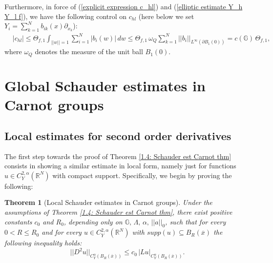 \documentclass{article}
\newtheorem{theorem}{Theorem}[section]
\numberwithin{equation}{section}
\begin{document}
\vspace{2mm}

Furthermore, in force of (\ref{explicit expression c_hl}) and (\ref{elliptic estimate Y_h Y_l f}), we have the following control on $c_{hl}$ (here below we set $Y_i=\sum_{k=1}^N b_{ik}(x) \partial_{x_k}$):
    \begin{align*}
        & |c_{hl}| \leq \Theta_{f,1} \int_{||w||=1}\sum_{i=1}^N |b_i(w)| \, dw \leq \Theta_{f,1} \, \omega_Q \sum_{k=1}^N ||b_i||_{L^{\infty}(\partial B_1(0))} = c(\mathbb{G}) \, \Theta_{f,1},
    \end{align*}
    where $\omega_Q$ denotes the measure of the unit ball $B_1(0)$.

\vspace{5mm}

\section{Global Schauder estimates in Carnot groups} \label{sec 3}
\subsection{Local estimates for second order derivatives}

The first step towards the proof of Theorem \ref{1.4: Schauder est Carnot thm} consists in showing a similar estimate in local form, namely just for functions $u \in C^{2,\alpha}_Y(\mathbb{R}^N)$ with  compact support. Specifically, we begin by proving the following:

\vspace{2mm}

\begin{theorem}[Local Schauder estimates in Carnot groups]
\label{local C^alpha estimate thm}
    Under the assumptions of Theorem \ref{1.4: Schauder est Carnot thm}, there exist positive constants $c_0$ and $R_0$, depending only on $\mathbb{G}, \, \Lambda, \, \alpha, \, ||a||_0$, such that for every $0<R \leq R_0$ and for every $u \in C^{2, \alpha}_Y(\mathbb{R}^N)$ with $supp(u) \subseteq B_R(\overline{x})$ the following inequality holds:
    \begin{equation}
    \label{||Y_h Y_l u|| <= C ||Lu||}
        ||D^2 u||_{C^{\alpha}_Y(B_R(\overline{x}))} \leq c_0 \, |Lu|_{C^{\alpha}_Y(B_R(\overline{x}))}.
    \end{equation}
\end{theorem}

\vspace{2mm}
\end{document}
